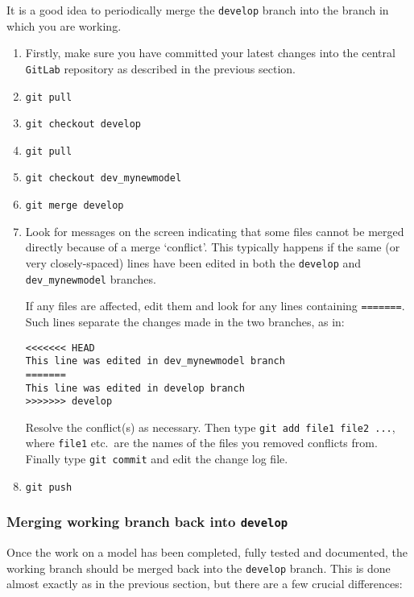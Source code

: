 It is a good idea to periodically merge the \texttt{develop} branch into the
branch in which you are working.
\begin{enumerate}

\item Firstly, make sure you have committed your latest changes into the
  central \texttt{GitLab} repository as described in the previous section.

\item \texttt{git pull}

\item \texttt{git checkout develop}

\item \texttt{git pull}

\item \texttt{git checkout dev\_mynewmodel}

\item \texttt{git merge develop}

\item Look for messages on the screen indicating that some files cannot be
  merged directly because of a merge `conflict'. This typically happens if the
  same (or very closely-spaced) lines have been edited in both the
  \texttt{develop} and \texttt{dev\_mynewmodel} branches.

  If any files are affected, edit them and look for any lines containing
  \texttt{=======}. Such lines separate the changes made in the two branches,
  as in:
\begin{verbatim}
<<<<<<< HEAD
This line was edited in dev_mynewmodel branch
=======
This line was edited in develop branch
>>>>>>> develop
\end{verbatim}
  Resolve the conflict(s) as necessary. Then type \texttt{git add file1 file2 ...}, where
  \texttt{file1} etc.\ are the names of the files you removed conflicts
  from. Finally type \texttt{git commit} and edit the change log file.

\item \texttt{git push}

\end{enumerate}

\subsubsection{Merging working branch back into \texttt{develop}}

Once the work on a model has been completed, fully tested and documented, the
working branch should be merged back into the \texttt{develop} branch. This is
done almost exactly as in the previous section, but there are a few crucial
differences:

